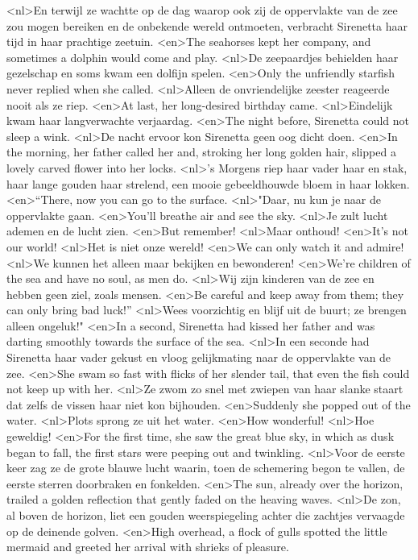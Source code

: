 <nl>En terwijl ze wachtte op de dag waarop ook zij de oppervlakte van de zee zou mogen bereiken en de onbekende wereld ontmoeten, verbracht Sirenetta haar tijd in haar prachtige zeetuin.
<en>The seahorses kept her company, and sometimes a dolphin would come and play.
<nl>De zeepaardjes behielden haar gezelschap en soms kwam een dolfijn spelen.
<en>Only the unfriendly starfish never replied when she called.
<nl>Alleen de onvriendelijke zeester reageerde nooit als ze riep.
<en>At last, her long-desired birthday came.
<nl>Eindelijk kwam haar langverwachte verjaardag.
<en>The night before, Sirenetta could not sleep a wink.
<nl>De nacht ervoor kon Sirenetta geen oog dicht doen.
<en>In the morning, her father called her and, stroking her long golden hair, slipped a lovely carved flower into her locks.
<nl>'s Morgens riep haar vader haar en stak, haar lange gouden haar strelend, een mooie gebeeldhouwde bloem in haar lokken.
<en>“There, now you can go to the surface.
<nl>"Daar, nu kun je naar de oppervlakte gaan.
<en>You’ll breathe air and see the sky.
<nl>Je zult lucht ademen en de lucht zien.
<en>But remember!
<nl>Maar onthoud!
<en>It’s not our world!
<nl>Het is niet onze wereld!
<en>We can only watch it and admire!
<nl>We kunnen het alleen maar bekijken en bewonderen!
<en>We’re children of the sea and have no soul, as men do.
<nl>Wij zijn kinderen van de zee en hebben geen ziel, zoals mensen.
<en>Be careful and keep away from them; they can only bring bad luck!” 
<nl>Wees voorzichtig en blijf uit de buurt; ze brengen alleen ongeluk!"
<en>In a second, Sirenetta had kissed her father and was darting smoothly towards the surface of the sea.
<nl>In een seconde had Sirenetta haar vader gekust en vloog gelijkmating naar de oppervlakte van de zee.
<en>She swam so fast with flicks of her slender tail, that even the fish could not keep up with her.
<nl>Ze zwom zo snel met zwiepen van haar slanke staart dat zelfs de vissen haar niet kon bijhouden.
<en>Suddenly she popped out of the water.
<nl>Plots sprong ze uit het water.
<en>How wonderful!
<nl>Hoe geweldig!
<en>For the first time, she saw the great blue sky, in which as dusk began to fall, the first stars were peeping out and twinkling.
<nl>Voor de eerste keer zag ze de grote blauwe lucht waarin, toen de schemering begon te vallen, de eerste sterren doorbraken en fonkelden.
<en>The sun, already over the horizon, trailed a golden reflection that gently faded on the heaving waves.
<nl>De zon, al boven de horizon, liet een gouden weerspiegeling achter die zachtjes vervaagde op de deinende golven.
<en>High overhead, a flock of gulls spotted the little mermaid and greeted her arrival with shrieks of pleasure.
